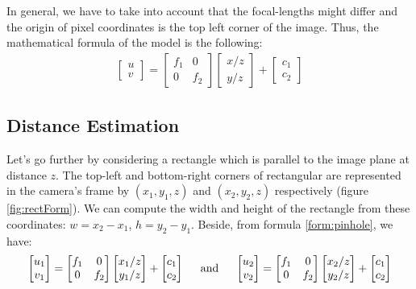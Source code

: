 In general, we have to take into account that the focal-lengths might differ and the origin of pixel coordinates is the top left corner of the image. Thus, the mathematical formula of the model is the following:
\begin{align}
	\label{form:pinhole}
\begin{bmatrix}
	u \\
	v
\end{bmatrix} = \begin{bmatrix}
f_1 & 0 \\
0 & f_2 
\end{bmatrix} \begin{bmatrix}
x/z\\
y/z
\end{bmatrix} + \begin{bmatrix}
c_1 \\ c_2
\end{bmatrix}
\end{align}

\subsection{Distance Estimation}
Let's go further by considering a rectangle which is parallel to the image plane at distance $z$. The top-left and bottom-right corners of rectangular are represented in the camera's frame by $(x_1, y_1, z)$ and $(x_2, y_2, z)$ respectively (figure \ref{fig:rectForm}). We can compute the width and height of the rectangle from these coordinates: $w = x_2 - x_1$, $h = y_2 - y_1$. Beside, from formula \ref{form:pinhole}, we have:
\begin{align}
	\label{form:dist0}
	\begin{bmatrix}
		u_1 \\
		v_1
	\end{bmatrix} = \begin{bmatrix}
	f_1 & 0 \\
	0 & f_2 
\end{bmatrix} \begin{bmatrix}
x_1/z\\
y_1/z
\end{bmatrix} + \begin{bmatrix}
c_1 \\ c_2
\end{bmatrix}
\hspace{0.5cm} \text{and} \hspace{0.5cm}
	\begin{bmatrix}
		u_2 \\
		v_2
	\end{bmatrix} = \begin{bmatrix}
	f_1 & 0 \\
	0 & f_2 
\end{bmatrix} \begin{bmatrix}
x_2/z\\
y_2/z
\end{bmatrix} + \begin{bmatrix}
c_1 \\ c_2
\end{bmatrix}
\end{align}

